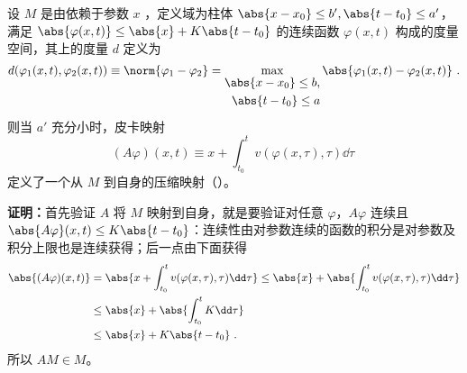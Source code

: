 \begin{theorem}{}\label{the_PicMap_2}
设 $M$ 是由依赖于参数 $x$ ，定义域为柱体 $\abs{x-x_0}\leq b',\abs{t-t_0}\leq a'$，满足 $\abs{\varphi(x,t)}\leq \abs{x}+K\abs{t-t_0}$ 的连续函数 $\varphi(x,t)$ 构成的度量空间，其上的度量 $d$ 定义为
\begin{equation}
d(\varphi_1(x,t),\varphi_2(x,t))\equiv\norm{\varphi_1-\varphi_2}=\max_{\begin{aligned}\abs{x-x_0}\leq b,\\\abs{t-t_0}\leq a\end{aligned}}\abs{\varphi_1(x,t)-\varphi_2(x,t)}~.
\end{equation}
则当 $a'$ 充分小时，皮卡映射
\begin{equation}
(A\varphi)(x,t)\equiv x+\int_{t_0}^{t}v(\varphi(x,\tau),\tau)\dd \tau~
\end{equation}
定义了一个从 $M$ 到自身的压缩映射（）。
\end{theorem}
\textbf{证明：}首先验证 $A$ 将 $M$ 映射到自身，就是要验证对任意 $\varphi$，$A\varphi$ 连续且 $\abs{A\varphi}(x,t)\leq K\abs{t-t_0}$：连续性由对参数连续的函数的积分是对参数及积分上限也是连续获得；后一点由下面获得
\begin{equation}
\begin{aligned}
\abs{(A\varphi)(x,t)}&=\abs{x+\int_{t_0}^t v(\varphi(x,\tau),\tau)\dd \tau}\leq\abs{x}+\abs{\int_{t_0}^t v(\varphi(x,\tau),\tau)\dd \tau}\\
&\leq\abs{x}+\abs{\int_{t_0}^t K\dd \tau}\\
&\leq\abs{x}+K\abs{t-t_0}~.
\end{aligned}
\end{equation}
所以 $AM\in M$。

